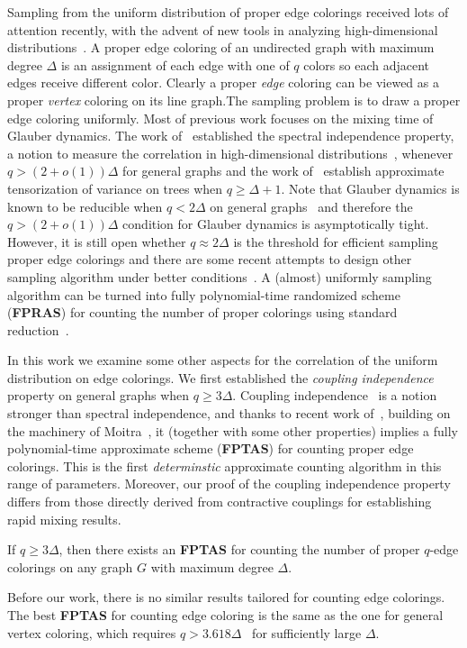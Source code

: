 \documentclass[a4paper,11pt]{article}
\begin{document}
Sampling from the uniform distribution of proper edge colorings received lots of attention recently, with the advent of new tools in analyzing high-dimensional distributions~\cite{DHP20,ALOG21,WZZ24,CCFV25}. A proper edge coloring of an undirected graph with maximum degree $\Delta$ is an assignment of each edge with one of $q$ colors so each adjacent edges receive different color. Clearly a proper \emph{edge} coloring can be viewed as a proper \emph{vertex} coloring on its line graph.The sampling problem is to draw a proper edge coloring uniformly. Most of previous work focuses on the mixing time of Glauber dynamics. The work of~\cite{WZZ24} established the spectral independence property, a notion to measure the correlation in high-dimensional distributions~\cite{ALO21}, whenever $q>(2+o(1))\Delta$ for general graphs and the work of~\cite{CCFV25} establish approximate tensorization of variance on trees when $q\ge \Delta+1$. Note that Glauber dynamics is known to be reducible when $q<2\Delta$ on general graphs~\cite{MJNP19} and therefore the $q>(2+o(1))\Delta$ condition for Glauber dynamics is asymptotically tight. However, it is still open whether $q\approx 2\Delta$ is the threshold for efficient sampling proper edge colorings and there are some recent attempts to design other sampling algorithm under better conditions~\cite{DKLP25}. A (almost) uniformly sampling algorithm can be turned into fully polynomial-time randomized scheme (\textbf{FPRAS}) for counting the number of proper colorings using standard reduction~\cite{JVV86}. 

In this work we examine some other aspects for the correlation of the uniform distribution on edge colorings. We first established the \emph{coupling independence} property on general graphs when $q\ge 3 \Delta$. Coupling independence~\cite{CZ23} is a notion stronger than spectral independence, and thanks to recent work of~\cite{CFGZZ24}, building on the machinery of Moitra~\cite{Moitra19}, it (together with some other properties) implies a fully polynomial-time approximate scheme (\textbf{FPTAS}) for counting proper edge colorings. This is the first \emph{determinstic} approximate counting algorithm in this range of parameters. Moreover, our proof of the coupling independence property differs from those directly derived from contractive couplings for establishing rapid mixing results.


\begin{theorem}[Informal] \label{thm:FPTAS-informal}
    If $q\geq 3\Delta$, then there exists an \textbf{FPTAS} for counting the number of proper $q$-edge colorings on any graph $G$ with maximum degree $\Delta$.
\end{theorem}
Before our work, there is no similar results tailored for counting edge colorings. The best \textbf{FPTAS} for counting edge coloring is the same as the one for general vertex coloring, which requires $q>3.618\Delta$~\cite{CV25,CFGZZ24} for sufficiently large $\Delta$.
\end{document}
